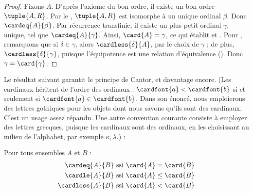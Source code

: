 \documentclass[../../../include/open-logic-section]{subfiles}
\begin{document}
\begin{proof}
Fixons $A$. D'après l'axiome du bon ordre,
il existe un bon ordre $\tuple{A, R}$.
Par le ,
$\tuple{A, R}$ est isomorphe à un unique ordinal
$\beta$. Donc $\cardeq{A}{\beta}$.
Par récurrence transfinie, il existe un plus petit
ordinal $\gamma$, unique, tel que
$\cardeq{A}{\gamma}$. Ainsi,
$\card{A} = \gamma$, ce qui établit
 et .
Pour , remarquons que
si $\delta \in \gamma$, alors
$\cardless{\delta}{A}$, par le choix de
$\gamma$ ; de plus,
$\cardless{\delta}{\gamma}$, puisque
l'équipotence est une relation d'équivalence
().
Donc $\gamma = \card{\gamma}$.
\end{proof}

Le résultat suivant garantit le principe de Cantor,
et davantage encore. (Les cardinaux héritent de
l'ordre des ordinaux : $\cardfont{a} <
\cardfont{b}$ si et seulement si
$\cardfont{a} \in \cardfont{b}$. Dans son
énoncé, nous emploierons des lettres gothiques
pour les objets dont nous savons qu'ils sont
des cardinaux. C'est un usage assez répandu.
Une autre convention courante consiste à employer
des lettres grecques, puisque les cardinaux sont
des ordinaux, en les choisissant au milieu de
l'alphabet, par exemple $\kappa, \lambda$.) :
\begin{lem}
Pour tous ensembles $A$ et $B$ :
\begin{align*}
	\cardeq{A}{B}
	&\text{ ssi } \card{A} = \card{B}\\
	\cardle{A}{B}
	&\text{ ssi } \card{A} \leq \card{B}\\
	\cardless{A}{B}
	&\text{ ssi } \card{A} < \card{B}
\end{align*}
\end{lem}
\end{document}
